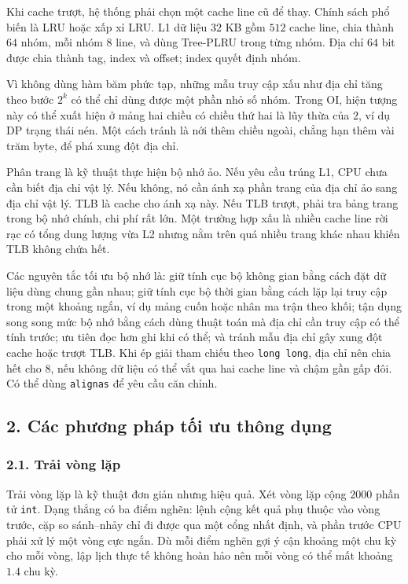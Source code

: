 \documentclass[11pt]{article}
\begin{document}
Khi cache trượt, hệ thống phải chọn một cache line cũ để thay. Chính sách phổ
biến là LRU hoặc xấp xỉ LRU. L1 dữ liệu \(32\) KB gồm \(512\) cache line, chia
thành \(64\) nhóm, mỗi nhóm \(8\) line, và dùng Tree-PLRU trong từng nhóm. Địa
chỉ \(64\) bit được chia thành tag, index và offset; index quyết định nhóm.

Vì không dùng hàm băm phức tạp, những mẫu truy cập xấu như địa chỉ tăng theo bước
\(2^k\) có thể chỉ dùng được một phần nhỏ số nhóm. Trong OI, hiện tượng này có
thể xuất hiện ở mảng hai chiều có chiều thứ hai là lũy thừa của \(2\), ví dụ
DP trạng thái nén. Một cách tránh là nới thêm chiều ngoài, chẳng hạn thêm vài
trăm byte, để phá xung đột địa chỉ.

Phân trang là kỹ thuật thực hiện bộ nhớ ảo. Nếu yêu cầu trúng L1, CPU chưa cần
biết địa chỉ vật lý. Nếu không, nó cần ánh xạ phần trang của địa chỉ ảo sang
địa chỉ vật lý. TLB là cache cho ánh xạ này. Nếu TLB trượt, phải tra bảng trang
trong bộ nhớ chính, chi phí rất lớn. Một trường hợp xấu là nhiều cache line rời
rạc có tổng dung lượng vừa L2 nhưng nằm trên quá nhiều trang khác nhau khiến
TLB không chứa hết.

Các nguyên tắc tối ưu bộ nhớ là: giữ tính cục bộ không gian bằng cách đặt dữ
liệu dùng chung gần nhau; giữ tính cục bộ thời gian bằng cách lặp lại truy cập
trong một khoảng ngắn, ví dụ mảng cuốn hoặc nhân ma trận theo khối; tận dụng
song song mức bộ nhớ bằng cách dùng thuật toán mà địa chỉ cần truy cập có thể
tính trước; ưu tiên đọc hơn ghi khi có thể; và tránh mẫu địa chỉ gây xung đột
cache hoặc trượt TLB. Khi ép giải tham chiếu theo \texttt{long long}, địa chỉ
nên chia hết cho \(8\), nếu không dữ liệu có thể vắt qua hai cache line và chậm
gần gấp đôi. Có thể dùng \texttt{alignas} để yêu cầu căn chỉnh.

\subsection*{2. Các phương pháp tối ưu thông dụng}

\subsubsection*{2.1. Trải vòng lặp}

Trải vòng lặp là kỹ thuật đơn giản nhưng hiệu quả. Xét vòng lặp cộng \(2000\)
phần tử \texttt{int}. Dạng thẳng có ba điểm nghẽn: lệnh cộng kết quả phụ thuộc
vào vòng trước, cặp so sánh--nhảy chỉ đi được qua một cổng nhất định, và phần
trước CPU phải xử lý một vòng cực ngắn. Dù mỗi điểm nghẽn gợi ý cận khoảng một
chu kỳ cho mỗi vòng, lập lịch thực tế không hoàn hảo nên mỗi vòng có thể mất
khoảng \(1.4\) chu kỳ.
\end{document}
